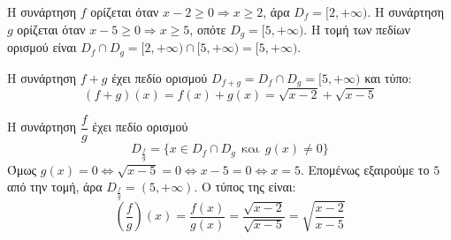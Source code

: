 \lysh
Η συνάρτηση $f$ ορίζεται όταν $x-2\geq 0\Rightarrow x\geq 2$, άρα $D_f=[2,+\infty)$. Η συνάρτηση $g$ ορίζεται όταν $x-5\geq 0\Rightarrow x\geq 5$, οπότε $D_g=[5,+\infty)$. Η τομή των πεδίων ορισμού είναι $D_f \cap D_g = [2,+\infty) \cap [5,+\infty) = [5,+\infty)$.

\begin{alist}
\item Η συνάρτηση $f+g$ έχει πεδίο ορισμού $D_{f+g}=D_f \cap D_g = [5,+\infty)$ και τύπο:
\[(f+g)(x)=f(x)+g(x)=\sqrt{x-2}+\sqrt{x-5}\]

\item Η συνάρτηση $\dfrac{f}{g}$ έχει πεδίο ορισμού
\[ D_{\frac{f}{g}} = \{x\in D_f\cap D_g \ \ \text{και}\ \ g(x)\neq 0\} \]
Όμως $g(x)=0 \Leftrightarrow \sqrt{x-5}=0 \Leftrightarrow x-5=0 \Leftrightarrow x=5$. Επομένως εξαιρούμε το $5$ από την τομή, άρα $D_{\frac{f}{g}} = (5,+\infty)$. Ο τύπος της είναι:
\[\left(\dfrac{f}{g}\right)(x)=\dfrac{f(x)}{g(x)}=\dfrac{\sqrt{x-2}}{\sqrt{x-5}}=\sqrt{\dfrac{x-2}{x-5}}\]
\end{alist}

